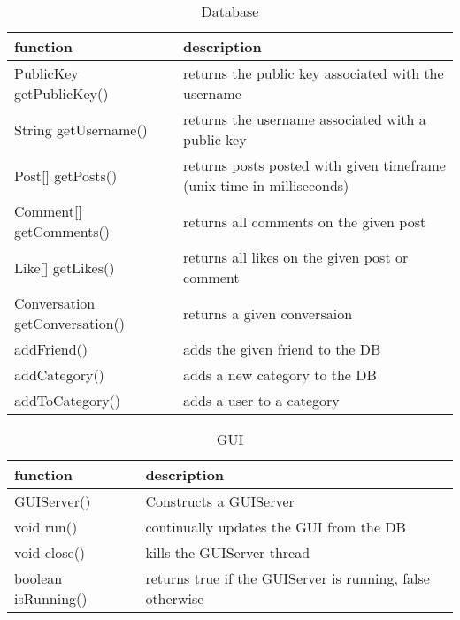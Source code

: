 \begin{table}[h]
    \centering
    \begin{tabular}{p{5cm}p{9cm}}
    function                 & description\\ \hline
    PublicKey getPublicKey() & returns the public key associated with the username\\
    String getUsername()     & returns the username associated with a public key\\    
    
    Post[] getPosts()        & returns posts posted with given timeframe (unix time in milliseconds)\\
    Comment[] getComments()  & returns all comments on the given post\\
    Like[] getLikes()        & returns all likes on the given post or comment\\
    
    Conversation getConversation() & returns a given conversaion\\
    
    addFriend()              & adds the given friend to the DB\\
    addCategory()            & adds a new category to the DB\\
    addToCategory()          & adds a user to a category\\
    \end{tabular}
    \caption{Database}
\end{table}

\begin{table}[h]
    \centering
    \begin{tabular}{p{3.6cm}p{9cm}}
    function            & description\\ \hline
    GUIServer()         & Constructs a GUIServer\\
    void run()          & continually updates the GUI from the DB\\
    void close()        & kills the GUIServer thread\\
    
    boolean isRunning() & returns true if the GUIServer is running, false otherwise\\
    \end{tabular}
    \caption{GUI}
\end{table}

